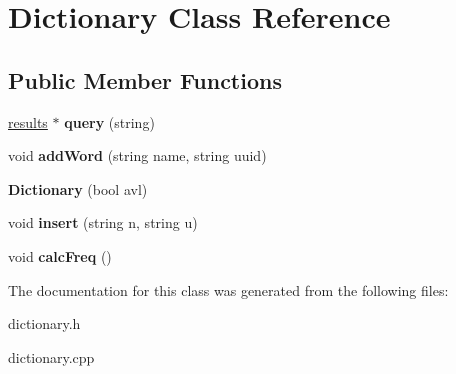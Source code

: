 \hypertarget{classDictionary}{\section{Dictionary Class Reference}
\label{classDictionary}
}
\subsection*{Public Member Functions}
\begin{DoxyCompactItemize}
\item 
\hypertarget{classDictionary_a590d3076095b179aa1aeb4c8d22234ff}{\hyperlink{classresults}{results} $\ast$ {\bfseries query} (string)}\label{classDictionary_a590d3076095b179aa1aeb4c8d22234ff}

\item 
\hypertarget{classDictionary_a3106fd2d9a299614602bf2f424984de0}{void {\bfseries add\-Word} (string name, string uuid)}\label{classDictionary_a3106fd2d9a299614602bf2f424984de0}

\item 
\hypertarget{classDictionary_a7fe3bb93d4e644f787b1d14f247131c2}{{\bfseries Dictionary} (bool avl)}\label{classDictionary_a7fe3bb93d4e644f787b1d14f247131c2}

\item 
\hypertarget{classDictionary_a67684a55693cc41573d3adbda4929b6a}{void {\bfseries insert} (string n, string u)}\label{classDictionary_a67684a55693cc41573d3adbda4929b6a}

\item 
\hypertarget{classDictionary_a533556e6be15decdc06207bad3ad03c1}{void {\bfseries calc\-Freq} ()}\label{classDictionary_a533556e6be15decdc06207bad3ad03c1}

\end{DoxyCompactItemize}


The documentation for this class was generated from the following files\-:\begin{DoxyCompactItemize}
\item 
dictionary.\-h\item 
dictionary.\-cpp\end{DoxyCompactItemize}
